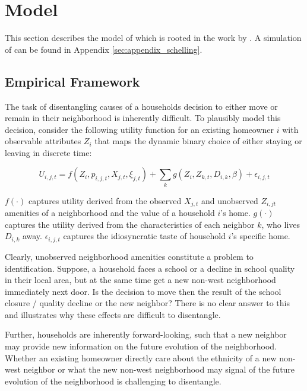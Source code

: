 \documentclass[../main.tex]{subfiles}
\begin{document}
\section{Model}
\label{sec:model}
This section describes the model of \textcite{Bayer_2022_nearest_neighbor} which is rooted in the work by \textcite{schelling1971dynamic}. A simulation of \textcite{schelling1971dynamic} can be found in Appendix \ref{sec:appendix_schelling}.

\subsection{Empirical Framework}
The task of disentangling causes of a households decision to either move or remain in their neighborhood is inherently difficult. To plausibly model this decision, consider the following utility function for an existing homeowner $i$ with observable attributes $Z_i$ that maps the dynamic binary choice of either staying or leaving in discrete time:

\begin{equation}
    U_{i, j, t} = f(Z_i, p_{i, j, t}, X_{j, t}, \xi_{j,t }) + \sum_k g(Z_i, Z_{k, t}, D_{i, k}, \beta) + \epsilon_{i, j, t}
    \label{eq:utility_household_moving}
\end{equation}

$f(\cdot)$ captures utility derived from the observed $X_{j,t}$ and unobserved $Z_{i, jt}$ amenities of a neighborhood and the value of a household $i$'s home. $g(\cdot)$ captures the utility derived from the characteristics of each neighbor $k$, who lives $D_{i, k}$ away. $\epsilon_{i, j, t}$ captures the idiosyncratic taste of household $i$'s specific home. 

Clearly, unobserved neighborhood amenities constitute a problem to identification. Suppose, a household faces a school or a decline in school quality in their local area, but at the same time get a new non-west neighborhood immediately next door. Is the decision to move then the result of the school closure / quality decline or the new neighbor? There is no clear answer to this and illustrates why these effects are difficult to disentangle.

Further, households are inherently forward-looking, such that a new neighbor may provide new information on the future evolution of the neighborhood. Whether an existing homeowner directly care about the ethnicity of a new non-west neighbor or what the new non-west neighborhood may signal of the future evolution of the neighborhood is challenging to disentangle. 
\end{document}
